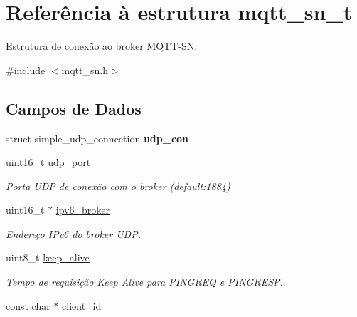 \hypertarget{structmqtt__sn__t}{\section{Referência à estrutura mqtt\+\_\+sn\+\_\+t}
\label{structmqtt__sn__t}
}


Estrutura de conexão ao broker M\+Q\+T\+T-\/\+S\+N.  




{\ttfamily \#include $<$mqtt\+\_\+sn.\+h$>$}

\subsection*{Campos de Dados}
\begin{DoxyCompactItemize}
\item 
\hypertarget{structmqtt__sn__t_a60158486bd2056b682241cd713f462ac}{struct simple\+\_\+udp\+\_\+connection {\bfseries udp\+\_\+con}}\label{structmqtt__sn__t_a60158486bd2056b682241cd713f462ac}

\item 
\hypertarget{structmqtt__sn__t_ae3c6408a5f3fb41bcddcf7e8266f41a6}{uint16\+\_\+t \hyperlink{structmqtt__sn__t_ae3c6408a5f3fb41bcddcf7e8266f41a6}{udp\+\_\+port}}\label{structmqtt__sn__t_ae3c6408a5f3fb41bcddcf7e8266f41a6}

\begin{DoxyCompactList}\small\item\em Porta U\+D\+P de conexão com o broker (default\+:1884) \end{DoxyCompactList}\item 
\hypertarget{structmqtt__sn__t_a058796ada31936dced646e5da3eb329a}{uint16\+\_\+t $\ast$ \hyperlink{structmqtt__sn__t_a058796ada31936dced646e5da3eb329a}{ipv6\+\_\+broker}}\label{structmqtt__sn__t_a058796ada31936dced646e5da3eb329a}

\begin{DoxyCompactList}\small\item\em Endereço I\+Pv6 do broker U\+D\+P. \end{DoxyCompactList}\item 
\hypertarget{structmqtt__sn__t_a276b967ec5d6e3305ee4695488e4472b}{uint8\+\_\+t \hyperlink{structmqtt__sn__t_a276b967ec5d6e3305ee4695488e4472b}{keep\+\_\+alive}}\label{structmqtt__sn__t_a276b967ec5d6e3305ee4695488e4472b}

\begin{DoxyCompactList}\small\item\em Tempo de requisição Keep Alive para P\+I\+N\+G\+R\+E\+Q e P\+I\+N\+G\+R\+E\+S\+P. \end{DoxyCompactList}\item 
\hypertarget{structmqtt__sn__t_a3880622ca383fee22fbbac18442bae32}{const char $\ast$ \hyperlink{structmqtt__sn__t_a3880622ca383fee22fbbac18442bae32}{client\+\_\+id}}\label{structmqtt__sn__t_a3880622ca383fee22fbbac18442bae32}


\end{DoxyCompactItemize}
